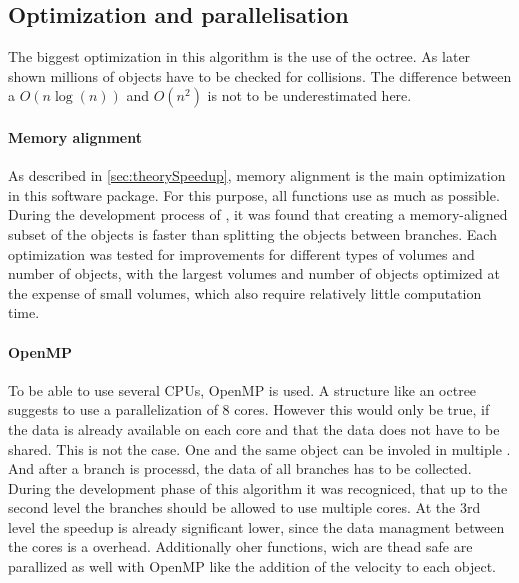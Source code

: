\subsection{Optimization and parallelisation}\label{sec:modelOpt}
% 
The biggest optimization in this algorithm is the use of the octree.
As later shown millions of objects have to be checked for collisions.
The difference between a $O(n\log(n))$ and $O(n^2)$ is not to be underestimated here.
%
\paragraph{Memory alignment}
As described in \cref{sec:theorySpeedup}, memory alignment is the main optimization in this software package.
For this purpose, all functions use  as much as possible.
During the development process of , it was found that creating a memory-aligned subset of the objects is faster than splitting the objects between branches.
Each optimization was tested for improvements for different types of volumes and number of objects, with the largest volumes and number of objects optimized at the expense of small volumes, which also require relatively little computation time.
%
%
\paragraph{OpenMP}
%
To be able to use several \acp{CPU}, \ac{OpenMP} is used.
A structure like an octree suggests to use a parallelization of 8 cores.
However this would only be true, if the data is already available on each core and that the data does not have to be shared.
This is not the case.
One and the same object can be involed in multiple .
And after a branch is processd, the data of all branches has to be collected.
During the development phase of this algorithm it was recogniced, that up to the second level the branches should be allowed to use multiple cores. At the 3rd level the speedup is already significant lower, since the data managment between the cores is a overhead.
Additionally oher functions, wich are thead safe are parallized as well with \ac{OpenMP} like \eg{} the addition of the velocity to each object.
%
%
%
